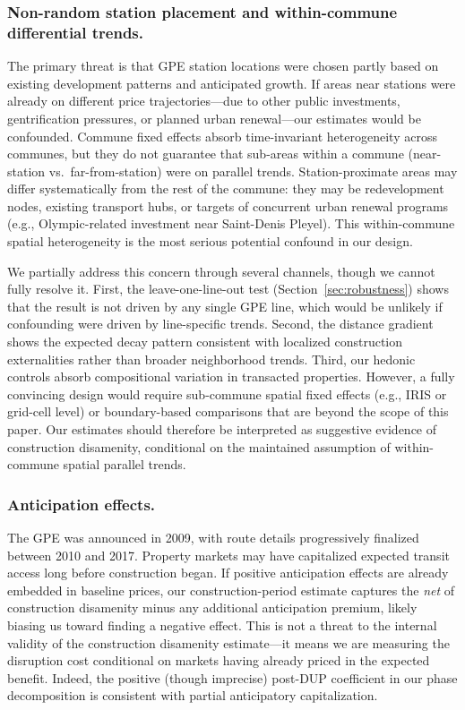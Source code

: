 \documentclass[12pt]{article}
\begin{document}
\subsubsection{Non-random station placement and within-commune differential trends.}
The primary threat is that GPE station locations were chosen partly based on existing development patterns and anticipated growth. If areas near stations were already on different price trajectories---due to other public investments, gentrification pressures, or planned urban renewal---our estimates would be confounded. Commune fixed effects absorb time-invariant heterogeneity across communes, but they do not guarantee that sub-areas within a commune (near-station vs.\ far-from-station) were on parallel trends. Station-proximate areas may differ systematically from the rest of the commune: they may be redevelopment nodes, existing transport hubs, or targets of concurrent urban renewal programs (e.g., Olympic-related investment near Saint-Denis Pleyel). This within-commune spatial heterogeneity is the most serious potential confound in our design.

We partially address this concern through several channels, though we cannot fully resolve it. First, the leave-one-line-out test (Section~\ref{sec:robustness}) shows that the result is not driven by any single GPE line, which would be unlikely if confounding were driven by line-specific trends. Second, the distance gradient shows the expected decay pattern consistent with localized construction externalities rather than broader neighborhood trends. Third, our hedonic controls absorb compositional variation in transacted properties. However, a fully convincing design would require sub-commune spatial fixed effects (e.g., IRIS or grid-cell level) or boundary-based comparisons that are beyond the scope of this paper. Our estimates should therefore be interpreted as suggestive evidence of construction disamenity, conditional on the maintained assumption of within-commune spatial parallel trends.

\subsubsection{Anticipation effects.}
The GPE was announced in 2009, with route details progressively finalized between 2010 and 2017. Property markets may have capitalized expected transit access long before construction began. If positive anticipation effects are already embedded in baseline prices, our construction-period estimate captures the \textit{net} of construction disamenity minus any additional anticipation premium, likely biasing us toward finding a negative effect. This is not a threat to the internal validity of the construction disamenity estimate---it means we are measuring the disruption cost conditional on markets having already priced in the expected benefit. Indeed, the positive (though imprecise) post-DUP coefficient in our phase decomposition is consistent with partial anticipatory capitalization.
\end{document}
